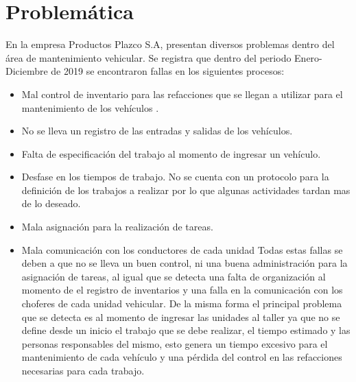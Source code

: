 \section{Problemática}
En la empresa Productos Plazco S.A, presentan diversos problemas dentro del área de mantenimiento vehicular. Se registra que dentro del periodo Enero-Diciembre de 2019 se encontraron fallas en los siguientes procesos:
\begin{itemize}
	\item Mal control de inventario para las refacciones que se llegan a utilizar para el mantenimiento de los vehículos .
	\item No se lleva un registro de las entradas y salidas de los vehículos.
	\item Falta de especificación del trabajo al momento de ingresar un vehículo.
	\item Desfase en los tiempos de trabajo. No se cuenta con un protocolo para la definición de los trabajos a realizar por lo que algunas actividades tardan mas de lo deseado.
	\item Mala asignación para la realización de tareas.
	\item Mala comunicación con los conductores de cada unidad
	Todas estas fallas se deben a que no se lleva un buen control, ni una buena administración para la asignación de tareas, al igual que se detecta una falta de organización al momento de el registro de inventarios y una falla en la comunicación con los choferes de cada unidad vehicular. De la misma forma el principal problema que se detecta es al momento de ingresar las unidades al taller ya que no se define desde un inicio el trabajo que se debe realizar, el tiempo estimado y las personas responsables del mismo, esto genera un tiempo excesivo para el mantenimiento de cada vehículo y una pérdida del control en las refacciones necesarias para cada trabajo.
\end{itemize}